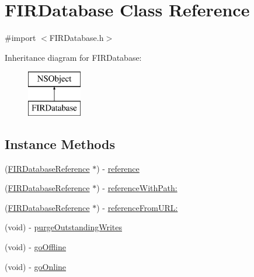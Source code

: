\hypertarget{interface_f_i_r_database}{}\section{F\+I\+R\+Database Class Reference}
\label{interface_f_i_r_database}


{\ttfamily \#import $<$F\+I\+R\+Database.\+h$>$}

Inheritance diagram for F\+I\+R\+Database\+:\begin{figure}[H]
\begin{center}
\leavevmode
\includegraphics[height=2.000000cm]{interface_f_i_r_database}
\end{center}
\end{figure}
\subsection*{Instance Methods}
\begin{DoxyCompactItemize}
\item 
(\hyperlink{interface_f_i_r_database_reference}{F\+I\+R\+Database\+Reference} $\ast$) -\/ \hyperlink{interface_f_i_r_database_ac375c2da24171f9294a59ca48974ec6c}{reference}
\item 
(\hyperlink{interface_f_i_r_database_reference}{F\+I\+R\+Database\+Reference} $\ast$) -\/ \hyperlink{interface_f_i_r_database_a788d6fa481a5f805438253ad4a587e67}{reference\+With\+Path\+:}
\item 
(\hyperlink{interface_f_i_r_database_reference}{F\+I\+R\+Database\+Reference} $\ast$) -\/ \hyperlink{interface_f_i_r_database_a44a5ae8fec35ef59f1dd4fcc967e2890}{reference\+From\+U\+R\+L\+:}
\item 
(void) -\/ \hyperlink{interface_f_i_r_database_a41f51d4eb46783975777d253a3ca59a8}{purge\+Outstanding\+Writes}
\item 
(void) -\/ \hyperlink{interface_f_i_r_database_a9de2f9f6a0215eabbb5fc4a912ce45cb}{go\+Offline}
\item 
(void) -\/ \hyperlink{interface_f_i_r_database_ab62c495823ec937982007e512d8a6153}{go\+Online}
\end{DoxyCompactItemize}
